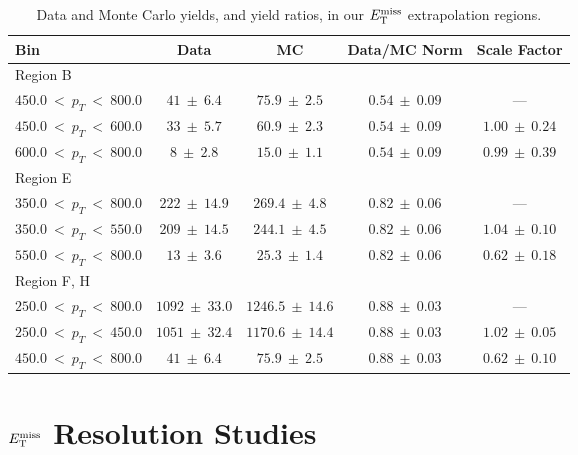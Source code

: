 \begin{table}[htb]
\centering
\caption{Data and Monte Carlo yields, and yield ratios, in our $E_\text{T}^\text{miss}$
  extrapolation regions.}
\label{tab:emu:sfmetextrap}
\begin{tabular}{|l|c|c|c|c|} \hline
Bin & Data & MC & Data/MC Norm & Scale Factor \\ \hline \hline
 \multicolumn{5}{|l|}{Region B} \\ \hline
 $450.0~<~p_{T}~<~800.0$ & $41~\pm~6.4$ & $75.9~\pm~2.5$ & $0.54~\pm~0.09$ & ---\\ \hline \hline
 $450.0~<~p_{T}~<~600.0$ & $33~\pm~5.7$ & $60.9~\pm~2.3$ & $0.54~\pm~0.09$ & $1.00~\pm~0.24$ \\ \hline
 $600.0~<~p_{T}~<~800.0$ & $8~\pm~2.8$ & $15.0~\pm~1.1$ & $0.54~\pm~0.09$ & $0.99~\pm~0.39$ \\ \hline
\hline
\multicolumn{5}{|l|}{Region E} \\ \hline
 $350.0~<~p_{T}~<~800.0$ & $222~\pm~14.9$ & $269.4~\pm~4.8$ & $0.82~\pm~0.06$ & ---\\ \hline \hline
 $350.0~<~p_{T}~<~550.0$ & $209~\pm~14.5$ & $244.1~\pm~4.5$ & $0.82~\pm~0.06$ & $1.04~\pm~0.10$ \\ \hline
 $550.0~<~p_{T}~<~800.0$ & $13~\pm~3.6$ & $25.3~\pm~1.4$ & $0.82~\pm~0.06$ & $0.62~\pm~0.18$ \\ \hline
\hline
\multicolumn{5}{|l|}{Region F, H} \\ \hline
 $250.0~<~p_{T}~<~800.0$ & $1092~\pm~33.0$ & $1246.5~\pm~14.6$ & $0.88~\pm~0.03$ & ---\\ \hline \hline
 $250.0~<~p_{T}~<~450.0$ & $1051~\pm~32.4$ & $1170.6~\pm~14.4$ & $0.88~\pm~0.03$ & $1.02~\pm~0.05$ \\ \hline
 $450.0~<~p_{T}~<~800.0$ & $41~\pm~6.4$ & $75.9~\pm~2.5$ & $0.88~\pm~0.03$ & $0.62~\pm~0.10$ \\ \hline
\end{tabular}
\end{table}

\chapter{\texorpdfstring{$E_\text{T}^\text{miss}$}{MET} Resolution Studies}
\label{apx:stop:metres}

